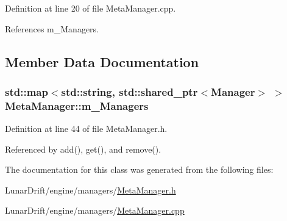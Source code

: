 Definition at line 20 of file Meta\+Manager.\+cpp.



References m\+\_\+\+Managers.



\subsection{Member Data Documentation}
\subsubsection[{\texorpdfstring{m\+\_\+\+Managers}{m_Managers}}]{\setlength{\rightskip}{0pt plus 5cm}std\+::map$<$std\+::string, std\+::shared\+\_\+ptr$<${\bf Manager}$>$ $>$ Meta\+Manager\+::m\+\_\+\+Managers\hspace{0.3cm}{\ttfamily [private]}}\hypertarget{class_meta_manager_a5b914ef44240c7fa97778b2240c318e3}{}\label{class_meta_manager_a5b914ef44240c7fa97778b2240c318e3}


Definition at line 44 of file Meta\+Manager.\+h.



Referenced by add(), get(), and remove().



The documentation for this class was generated from the following files\+:\begin{DoxyCompactItemize}
\item 
Lunar\+Drift/engine/managers/\hyperlink{_meta_manager_8h}{Meta\+Manager.\+h}\item 
Lunar\+Drift/engine/managers/\hyperlink{_meta_manager_8cpp}{Meta\+Manager.\+cpp}\end{DoxyCompactItemize}
